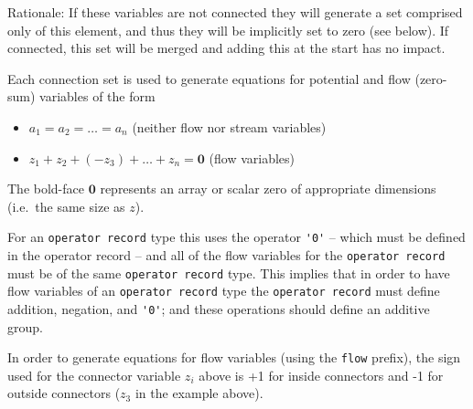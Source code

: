 \begin{nonnormative}
Rationale: If these variables are not connected they will generate a set comprised only of this element, and thus they will be implicitly set to zero (see below).
If connected, this set will be merged and adding this at the start has no impact.
\end{nonnormative}

Each connection set is used to generate equations for potential and flow (zero-sum) variables of the form
\begin{itemize}
\item
  $a_{1} = a_{2} = \ldots = a_{n}$ (neither flow nor stream variables)
\item
  $z_{1} + z_{2} + (-z_{3}) + \ldots + z_{n} = \mathbf{0}$ (flow variables)
\end{itemize}

The bold-face $\mathbf{0}$ represents an array or scalar zero of appropriate dimensions (i.e.\ the same size as $z$).

For an \lstinline!operator record! type this uses the operator \lstinline!'0'! -- which must be defined in the operator record -- and all of the flow variables for the \lstinline!operator record!
must be of the same \lstinline!operator record! type.
This implies that in order to have flow variables of an \lstinline!operator record! type the \lstinline!operator record! must define addition, negation, and \lstinline!'0'!; and these operations should define an additive group.

In order to generate equations for flow variables (using the \lstinline!flow! prefix), the sign used for the connector variable $z_{i}$ above is +1 for inside connectors and -1 for outside connectors ($z_{3}$ in the example above).

